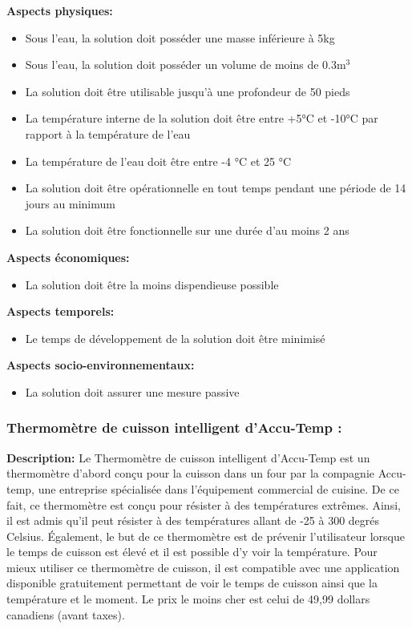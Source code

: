 \textbf{Aspects physiques:}
\begin{itemize}[label = {--}]
    \item Sous l'eau, la solution doit posséder une masse inférieure à 5kg
    \item Sous l'eau, la solution doit posséder un volume de moins de 0.3m$^3$
    \item La solution doit être utilisable jusqu'à une profondeur de 50 pieds
    \item La température interne de la solution doit être entre +5°C et -10°C par rapport à la température de l'eau
    \item La température de l'eau doit être entre -4 °C et 25 °C
    \item La solution doit être opérationnelle en tout temps pendant une période de 14 jours au minimum
    \item La solution doit être fonctionnelle sur une durée d'au moins 2 ans
\end{itemize}

\textbf{Aspects économiques:}
\begin{itemize}[label = {--}]
    \item La solution doit être la moins dispendieuse possible
\end{itemize}

\textbf{Aspects temporels:}
\begin{itemize}[label = {--}]
    \item Le temps de développement de la solution doit être minimisé
\end{itemize}

\textbf{Aspects socio-environnementaux:}
\begin{itemize}[label = {--}]
    \item La solution doit assurer une mesure passive
\end{itemize}

\subsubsection{Thermomètre de cuisson intelligent d’Accu-Temp :}
\label{subsubsection:accu-temp}

\textbf{Description:} Le Thermomètre de cuisson intelligent d’Accu-Temp est un thermomètre d’abord conçu pour la cuisson dans un four par la compagnie Accu-temp, une entreprise spécialisée dans l’équipement commercial de cuisine. De ce fait, ce thermomètre est conçu pour résister à des températures extrêmes. Ainsi, il est admis qu’il peut résister à des températures allant de -25 à 300 degrés Celsius. Également, le but de ce thermomètre est de prévenir l’utilisateur lorsque le temps de cuisson est élevé et il est possible d’y voir la température. Pour mieux utiliser ce thermomètre de cuisson, il est compatible avec une application disponible gratuitement permettant de voir le temps de cuisson ainsi que la température et le moment. Le prix le moins cher est celui de 49,99 dollars canadiens (avant taxes).\vspace{5mm}

